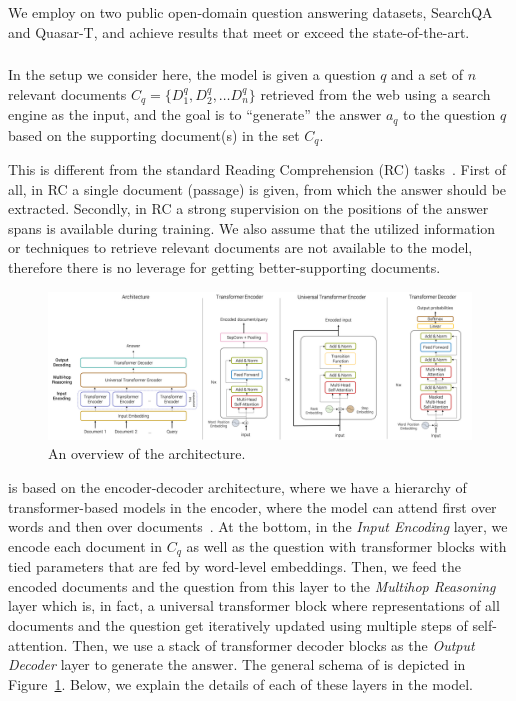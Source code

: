 We employ \tracrnet on two public open-domain question answering datasets, SearchQA and Quasar-T, and achieve results that meet or exceed the state-of-the-art. 

\subsubsection{\tracrnet} %
\label{sec:tra}
In the setup we consider here, the model is given a question $q$ and a set of $n$ relevant documents $C_q=\{D^q_1, D^q_2, \ldots D^q_n\}$ retrieved from the web using a search engine as the input, and the goal is to ``generate'' the answer $a_q$ to the question $q$ based on the supporting document(s) in the set $C_q$.

This is different from the standard Reading Comprehension (RC) tasks~\cite{hermann2015teaching,xiong2016dynamic}. 
First of all, in RC a single document (passage) is given, from which the answer should be extracted. 
Secondly, in RC a strong supervision on the positions of the answer spans is available during training.
We also assume that the utilized information or techniques to retrieve relevant documents are not available to the model, therefore there is no leverage for getting better-supporting documents.

\begin{figure}[!t]
 \centering
 \includegraphics[width=\textwidth]{04-part-03/chapter-06/figs_and_tables/fig_tracrnet.png}
 \caption{An overview of the \tracrnet architecture.}
 \label{fig:model}
\end{figure}

\tracrnet is based on the encoder-decoder architecture, where we have a hierarchy of transformer-based models in the encoder, where the model can attend first over words and then over documents~\citep{Dehghani2017:CIKM}. At the bottom, in the \emph{Input Encoding} layer, we encode each document in $C_q$ as well as the question with transformer blocks with tied parameters that are fed by word-level embeddings. 
Then, we feed the encoded documents and the question from this layer to the \emph{Multihop Reasoning} layer which is, in fact, a universal transformer block where representations of all documents and the question get iteratively updated using multiple steps of self-attention.
Then, we use a stack of transformer decoder blocks as the \emph{Output Decoder} layer to generate the answer. 
%
The general schema of \tracrnet is depicted in Figure~\ref{fig:model}. 
Below, we explain the details of each of these layers in the model.

